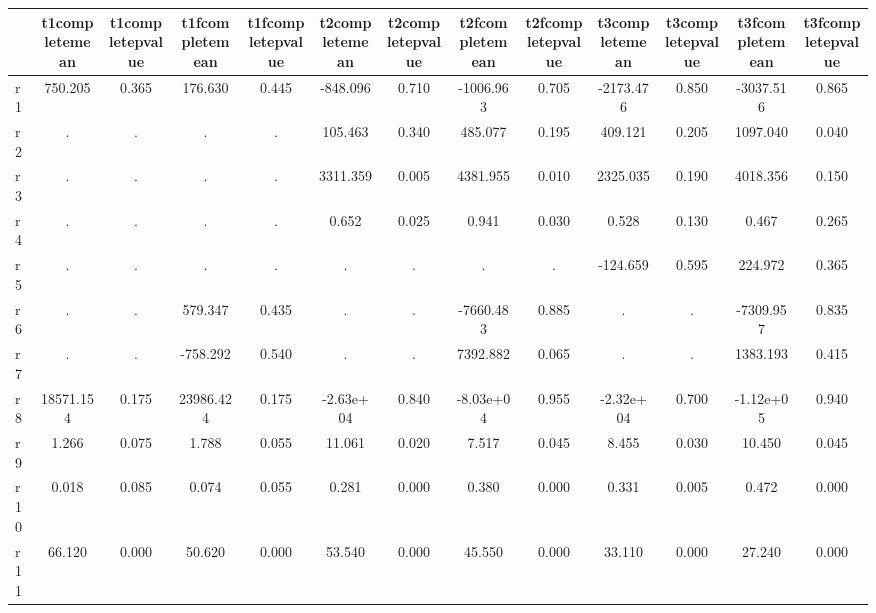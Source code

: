 \begin{table}[htbp]
\begin{tabular}{lcccccccccccc} \hline \hline
 & t1completemean  & t1completepvalue  & t1fcompletemean  & t1fcompletepvalue  & t2completemean  & t2completepvalue  & t2fcompletemean  & t2fcompletepvalue  & t3completemean  & t3completepvalue  & t3fcompletemean  & t3fcompletepvalue  \\  \hline 
r1 &   750.205 &     0.365 &   176.630 &     0.445 &  -848.096 &     0.710 & -1006.963 &     0.705 & -2173.476 &     0.850 & -3037.516 &     0.865 \\  
r2 &         . &         . &         . &         . &   105.463 &     0.340 &   485.077 &     0.195 &   409.121 &     0.205 &  1097.040 &     0.040 \\  
r3 &         . &         . &         . &         . &  3311.359 &     0.005 &  4381.955 &     0.010 &  2325.035 &     0.190 &  4018.356 &     0.150 \\  
r4 &         . &         . &         . &         . &     0.652 &     0.025 &     0.941 &     0.030 &     0.528 &     0.130 &     0.467 &     0.265 \\  
r5 &         . &         . &         . &         . &         . &         . &         . &         . &  -124.659 &     0.595 &   224.972 &     0.365 \\  
r6 &         . &         . &   579.347 &     0.435 &         . &         . & -7660.483 &     0.885 &         . &         . & -7309.957 &     0.835 \\  
r7 &         . &         . &  -758.292 &     0.540 &         . &         . &  7392.882 &     0.065 &         . &         . &  1383.193 &     0.415 \\  
r8 & 18571.154 &     0.175 & 23986.424 &     0.175 & -2.63e+04 &     0.840 & -8.03e+04 &     0.955 & -2.32e+04 &     0.700 & -1.12e+05 &     0.940 \\  
r9 &     1.266 &     0.075 &     1.788 &     0.055 &    11.061 &     0.020 &     7.517 &     0.045 &     8.455 &     0.030 &    10.450 &     0.045 \\  
r10 &     0.018 &     0.085 &     0.074 &     0.055 &     0.281 &     0.000 &     0.380 &     0.000 &     0.331 &     0.005 &     0.472 &     0.000 \\  
r11 &    66.120 &     0.000 &    50.620 &     0.000 &    53.540 &     0.000 &    45.550 &     0.000 &    33.110 &     0.000 &    27.240 &     0.000 \\  
\hline \hline \end{tabular}
\end{table}
